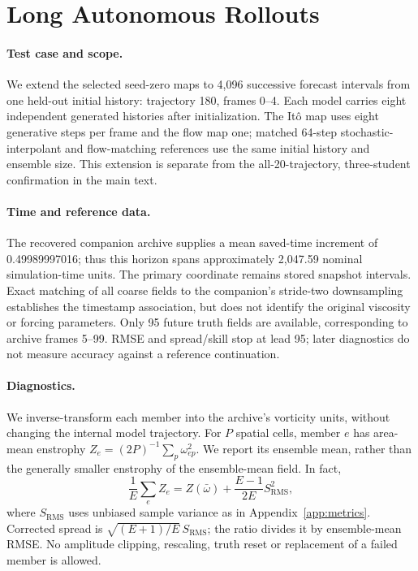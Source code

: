 \section{Long Autonomous Rollouts}
\label{app:long-horizon}

\paragraph{Test case and scope.}
We extend the selected seed-zero maps to 4,096 successive forecast intervals from one held-out initial history: trajectory 180, frames 0--4. Each model carries eight independent generated histories after initialization. The It\^o map uses eight generative steps per frame and the flow map one; matched 64-step stochastic-interpolant and flow-matching references use the same initial history and ensemble size. This extension is separate from the all-20-trajectory, three-student confirmation in the main text.

\paragraph{Time and reference data.}
The recovered companion archive supplies a mean saved-time increment of 0.49989997016; thus this horizon spans approximately 2,047.59 nominal simulation-time units. The primary coordinate remains stored snapshot intervals. Exact matching of all coarse fields to the companion's stride-two downsampling establishes the timestamp association, but does not identify the original viscosity or forcing parameters. Only 95 future truth fields are available, corresponding to archive frames 5--99. RMSE and spread/skill stop at lead 95; later diagnostics do not measure accuracy against a reference continuation.

\paragraph{Diagnostics.}
We inverse-transform each member into the archive's vorticity units, without changing the internal model trajectory. For $P$ spatial cells, member $e$ has area-mean enstrophy $Z_e=(2P)^{-1}\sum_p\omega_{ep}^2$. We report its ensemble mean, rather than the generally smaller enstrophy of the ensemble-mean field. In fact,
\begin{equation}
\frac1E\sum_e Z_e
= Z(\bar\omega)+\frac{E-1}{2E}S_{\mathrm{RMS}}^2,
\end{equation}
where $S_{\mathrm{RMS}}$ uses unbiased sample variance as in Appendix~\ref{app:metrics}. Corrected spread is $\sqrt{(E+1)/E}\,S_{\mathrm{RMS}}$; the ratio divides it by ensemble-mean RMSE. No amplitude clipping, rescaling, truth reset or replacement of a failed member is allowed.

